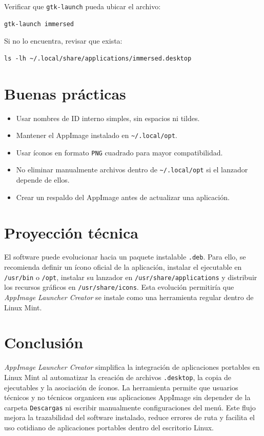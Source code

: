 \documentclass[11pt,a4paper]{article}
\begin{document}
Verificar que \texttt{gtk-launch} pueda ubicar el archivo:

\begin{lstlisting}[style=bashstyle]
gtk-launch immersed
\end{lstlisting}

Si no lo encuentra, revisar que exista:

\begin{lstlisting}[style=bashstyle]
ls -lh ~/.local/share/applications/immersed.desktop
\end{lstlisting}

\section{Buenas prácticas}

\begin{itemize}[leftmargin=1.2cm]
    \item Usar nombres de ID interno simples, sin espacios ni tildes.
    \item Mantener el AppImage instalado en \texttt{\~{}/.local/opt}.
    \item Usar íconos en formato \texttt{PNG} cuadrado para mayor compatibilidad.
    \item No eliminar manualmente archivos dentro de \texttt{\~{}/.local/opt} si el lanzador depende de ellos.
    \item Crear un respaldo del AppImage antes de actualizar una aplicación.
\end{itemize}

\section{Proyección técnica}

El software puede evolucionar hacia un paquete instalable \texttt{.deb}. Para ello, se recomienda definir un ícono oficial de la aplicación, instalar el ejecutable en \texttt{/usr/bin} o \texttt{/opt}, instalar su lanzador en \texttt{/usr/share/applications} y distribuir los recursos gráficos en \texttt{/usr/share/icons}. Esta evolución permitiría que \textit{AppImage Launcher Creator} se instale como una herramienta regular dentro de Linux Mint.

\section{Conclusión}

\textit{AppImage Launcher Creator} simplifica la integración de aplicaciones portables en Linux Mint al automatizar la creación de archivos \texttt{.desktop}, la copia de ejecutables y la asociación de íconos. La herramienta permite que usuarios técnicos y no técnicos organicen sus aplicaciones AppImage sin depender de la carpeta \texttt{Descargas} ni escribir manualmente configuraciones del menú. Este flujo mejora la trazabilidad del software instalado, reduce errores de ruta y facilita el uso cotidiano de aplicaciones portables dentro del escritorio Linux.
\end{document}
